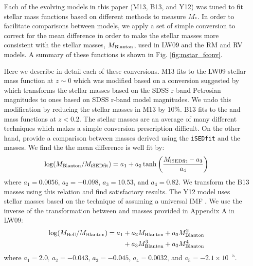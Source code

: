 \documentclass[useAMS,fleqn,usenatbib]{mnras}
\begin{document}
Each of the evolving models in this paper (M13, B13, and Y12) was tuned to fit stellar mass functions based on different methods to measure $M_*$.  In order to facilitate comparisons between models, we apply a set of simple conversion to correct for the mean difference in order to make the stellar masses more consistent with the \citet{Blanton:2007cv} stellar masses, $M_{\rm Blanton}$, used in LW09 and the RM and RV models.  A summary of these functions is shown in Fig. \ref{fig:mstar_fconv}.

Here we describe in detail each of these conversions.  M13 fits to the LW09 stellar mass function at $z \sim 0$ which was modified based on a conversion suggested by \citet{Guo:2010do} which transforms the stellar masses based on the SDSS r-band Petrosian magnitudes to ones based on SDSS r-band model magnitudes.  We undo this modification by reducing the stellar masses in M13 by $10\%$.  B13 fits to the \citet{Baldry:2008hm} and \citet{Moustakas:2013il} mass functions at $z < 0.2$.  The \citet{Baldry:2008hm} stellar masses are an average of many different techniques which makes a simple conversion prescription difficult.  On the other hand, \citet{Moustakas:2013il} provide a comparison between masses derived using the {\tt iSEDfit} and the \citet{Blanton:2007cv} masses.  We find the the mean difference is well fit by:
%
\begin{equation}
\log(M_{\rm Blanton}/M_{\rm iSEDfit}) = a_1+a_2\tanh\left(\frac{M_{\rm iSEDfit} - a_3}{a_4}\right)
\end{equation}
%
where $a_1 = 0.0056$, $a_2 = -0.098$, $a_3 =10.53$, and $a_4 = 0.82$.  We transform the B13 masses using this relation and find satisfactory results.  The Y12 model uses stellar masses based on the technique of \citet{Bell:2003hs} assuming a universal IMF \citep{Kroupa:2001ki, Borch:2006eu}.  We use the inverse of the transformation between \citet{Bell:2003hs} and \citet{Blanton:2007cv} masses provided in Appendix A in LW09:
%
\begin{align}
\log(M_{\rm Bell}/M_{\rm Blanton}) = a_1 &+ a_2 M_{\rm Blanton} + a_3 M_{\rm Blanton}^2 \nonumber \\
  & + a_3 M_{\rm Blanton}^3 + a_3 M_{\rm Blanton}^4
\end{align}
%
where $a_1 = 2.0$, $a_2 = -0.043$, $a_3 = -0.045$, $a_4 = 0.0032$, and $a_5=-2.1\times10^{-5}$.
\end{document}
